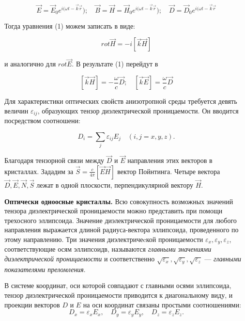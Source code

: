 \documentclass[a4paper, 12pt]{article}%
\begin{document}
\[\overrightarrow{E} = \overrightarrow{E}_0 e^{i(\omega t - \overrightarrow{k}\overrightarrow{r}}); \quad
\overrightarrow{B} = \overrightarrow{H} = \overrightarrow{H}_0 e^{i(\omega t - \overrightarrow{k}\overrightarrow{r}}); \quad
\overrightarrow{D} = \overrightarrow{D}_0 e^{i(\omega t - \overrightarrow{k}\overrightarrow{r}}\]

Тогда уравнения (1) можем записать в виде:

\[rot \overrightarrow{H} = -i [\overrightarrow{k} \overrightarrow{H}]\]

и аналогично для $rot \overrightarrow{E}$. В результате (1) перейдут в

\[[\overrightarrow{k} \overrightarrow{H}] = -\frac{\omega}{c} \overrightarrow{D}; \quad [\overrightarrow{k} \overrightarrow{E}] = \frac{\omega}{c} \overrightarrow{D}\]

Для характеристики оптических свойств анизотропной среды требуется девять величин $\varepsilon_{ij}$, образующих тензор диэлектрической проницаемости. Он вводится посредством соотношени:

\begin{equation}
D_i = \sum\limits_j \varepsilon_{ij} E_j \quad (i,j = x,y,z).
\end{equation}

Благодаря тензорной связи между $\overrightarrow{D}$ и $\overrightarrow{E}$ направления этих векторов в кристаллах. Зададим за $\overrightarrow{S} = \frac{c}{4\pi} \left[ \overrightarrow{E} \overrightarrow{H} \right]$ вектор Пойнтинга. Четыре вектора $\overrightarrow{D}, \overrightarrow{E}, \overrightarrow{N}, \overrightarrow{S}$ лежат в одной плоскости, перпендикулярной вектору $\overrightarrow{H}$.

 \textbf{Оптически одноосные кристаллы.} Всю совокупность возможных значений тензора диэлектрической проницаемости можно представить при помощи трехосного эллипсоида. Значение диэлектрической проницаемости для любого направления выражается длиной радиуса-вектора эллипсоида, проведенного по этому направлению. Три значения диэлектричеcкой проницаемости $\varepsilon_x, \varepsilon_y, \varepsilon_z$, соответствующие осям эллипсоидв, называются \textit{главными значениями диэлектрической проницаемости} и соответственно $\sqrt{\varepsilon_x}, \sqrt{\varepsilon_y}, \sqrt{\varepsilon_z}$ --- \textit{главными показателями преломления}.

В системе координат, оси которой совпадают с главными осями эллипсоида, тензор диэлектрической проницаемости приводится к диагональному виду, и проекции векторов $D$ и $E$ на оси координат связаны простыми соотношениями:
\begin{equation*}
	D_x = \varepsilon_x E_x, \quad D_y = \varepsilon_y E_y, \quad D_z = \varepsilon_z E_z.
\end{equation*}
\end{document}
